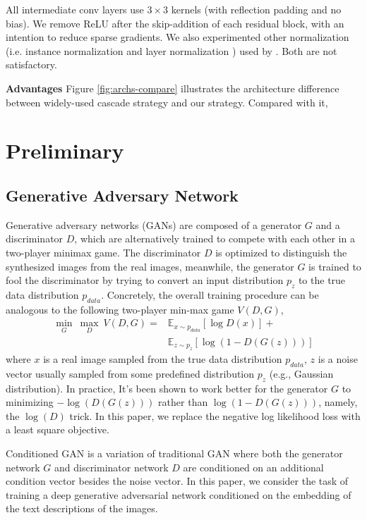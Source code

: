 \documentclass[10pt,twocolumn,letterpaper]{article}
\begin{document}
All intermediate conv layers use $3{\times}3$ kernels (with reflection padding and no bias). We remove ReLU after the skip-addition of each residual block, with an intention to reduce sparse gradients. 
We also experimented other normalization (i.e. instance normalization \cite{ulyanov2016instance} and layer normalization \cite{ba2016layer}) used by \cite{zhu2017unpaired,chen2017photographic}. Both are not satisfactory. 


\textbf{Advantages} Figure \ref{fig:archs-compare} illustrates the architecture difference between widely-used cascade strategy \cite{han2017stackgan,denton2015deep} and our strategy. Compared with it, 
\\


\section{Preliminary}
\subsection{Generative Adversary Network}
Generative adversary networks (GANs) are composed of a generator $G$ and a discriminator $D$, which are alternatively trained to compete with each other in a two-player minimax game. The discriminator $D$ is optimized to distinguish the synthesized images from the real images, meanwhile, the generator $G$ is trained to fool the discriminator by trying to convert an input distribution $p_z$ to the true data distribution $p_{data}$. Concretely, the overall training procedure can be analogous to the following two-player min-max game $V(D, G)$,
\begin{equation}
\label{game}
\begin{split}
\underset{G}{\min}\ \underset{D}{\max}\ V(D, G) =  &\mathbb{E}_{x\sim p_{data}}[\log D(x)] +  \\
&\mathbb{E}_{z\sim p_{z}}[\log (1-D(G(z)))]		   
\end{split}
\end{equation}
where $x$ is a real image sampled from the true data distribution $p_{data}$, $z$ is a noise vector usually sampled from some predefined distribution $p_{z}$ (e.g., Gaussian distribution).
In practice, It's been shown to work better for the generator $G$ to minimizing $-\log(D(G(z)))$ rather than $\log(1-D(G(z)))$, namely, the $\log(D)$ trick.
In this paper, we replace the negative log likelihood loss with a least square objective\cite{lsgan}. 

Conditioned GAN \cite{isola2016image} is a variation of traditional GAN where both the generator network $G$ and discriminator network $D$ are conditioned on an additional condition vector besides the noise vector. In this paper, we consider the task of training a deep  generative adversarial network conditioned on the embedding of the text descriptions of the images.
\end{document}
